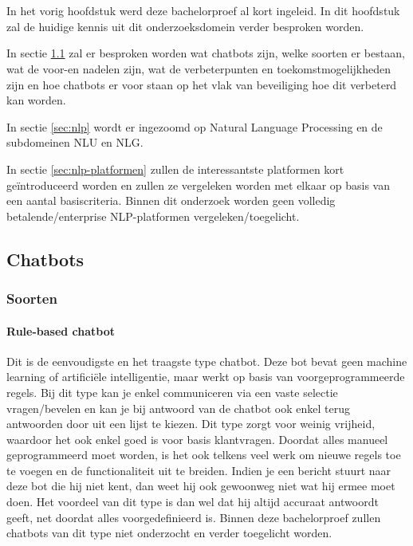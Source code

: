 \chapter{}
\label{ch:stand-van-zaken}

In het vorig hoofdstuk werd deze bachelorproef al kort ingeleid. In dit hoofdstuk zal de huidige kennis uit dit onderzoeksdomein verder besproken worden.

In sectie \ref{sec:chatbots} zal er besproken worden wat chatbots zijn, welke soorten er bestaan, wat de voor-en nadelen zijn, wat de verbeterpunten en toekomstmogelijkheden zijn en hoe chatbots er voor staan op het vlak van beveiliging hoe dit verbeterd kan worden.

In sectie \ref{sec:nlp} wordt er ingezoomd op Natural Language Processing en de subdomeinen NLU en NLG.

In sectie \ref{sec:nlp-platformen} zullen de interessantste platformen kort geïntroduceerd worden en zullen ze vergeleken worden met elkaar op basis van een aantal basiscriteria. Binnen dit onderzoek worden geen volledig betalende/enterprise NLP-platformen vergeleken/toegelicht.

\newpage
\section{Chatbots}
\label{sec:chatbots}

\subsection{Soorten}
\label{subsec:soorten}

\subsubsection{Rule-based chatbot}
\label{subsubsec:chatbots-soorten-rule-based-chatbot}

Dit is de eenvoudigste en het traagste type chatbot. Deze bot bevat geen machine learning of artificiële intelligentie, maar werkt op basis van voorgeprogrammeerde regels. Bij dit type kan je enkel communiceren via een vaste selectie vragen/bevelen en kan je bij antwoord van de chatbot ook enkel terug antwoorden door uit een lijst te kiezen. Dit type zorgt voor weinig vrijheid, waardoor het ook enkel goed is voor basis klantvragen. Doordat alles manueel geprogrammeerd moet worden, is het ook telkens veel werk om nieuwe regels toe te voegen en de functionaliteit uit te breiden. Indien je een bericht stuurt naar deze bot die hij niet kent, dan weet hij ook gewoonweg niet wat hij ermee moet doen. Het voordeel van dit type is dan wel dat hij altijd accuraat antwoordt geeft, net doordat alles voorgedefinieerd is. Binnen deze bachelorproef zullen chatbots van dit type niet onderzocht en verder toegelicht worden.

